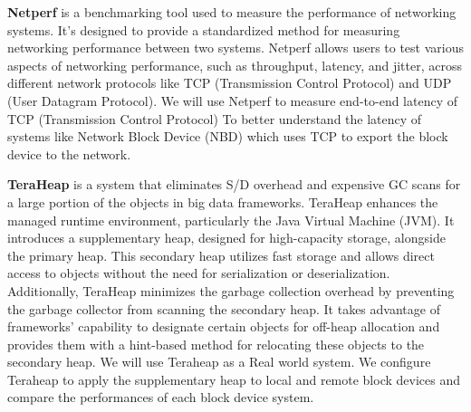 \textbf{Netperf} is a benchmarking tool used to measure the performance of networking systems. It's designed to provide a standardized method for measuring networking performance between two systems. Netperf allows users to test various aspects of networking performance, such as throughput, latency, and jitter, across different network protocols like TCP (Transmission Control Protocol) and UDP (User Datagram Protocol). We will use Netperf to measure end-to-end latency of TCP (Transmission Control Protocol) To better understand the latency of systems like Network Block Device (NBD) which uses TCP to export the block device to the network.
\vspace{1em}

\textbf{TeraHeap} is a system that eliminates S/D overhead and expensive GC scans for a
large portion of the objects in big data frameworks. TeraHeap enhances the
managed runtime environment, particularly the Java Virtual Machine (JVM). It
introduces a supplementary heap, designed for high-capacity storage, alongside
the primary heap. This secondary heap utilizes fast storage and allows direct
access to objects without the need for serialization or deserialization.
Additionally, TeraHeap minimizes the garbage collection overhead by preventing
the garbage collector from scanning the secondary heap. It takes advantage of
frameworks' capability to designate certain objects for off-heap allocation and
provides them with a hint-based method for relocating these objects to the
secondary heap. We will use Teraheap as a Real world system. We configure Teraheap to apply the supplementary heap to local and remote block devices and compare the performances of each block device system.
\vspace{1em}

